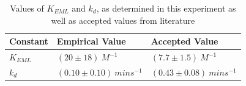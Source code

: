 \begin{table}[h]
    \begin{tabular}{| l | l | l |}
    \hline
    Constant & Empirical Value & Accepted Value \\ \hline
    $K_{EML}$ & $(20\pm{18}){\ }M^{-1}$ & $(7.7\pm{1.5}){\ }M^{-1}$ \cite{bib:easy_peasy_values} \\ \hline
    $k_{d}$ & $(0.10\pm{0.10}){\ }mins^{-1}$ & $(0.43\pm{0.08}){\ }mins^{-1}$ \cite{bib:easy_peasy_values} \\ 
    \hline
    \end{tabular}
    \caption[Table caption text]{Values of $K_{EML}$ and $k_d$, as determined in this experiment as well as accepted values from literature}
    \label{tbl:summary}
\end{table}